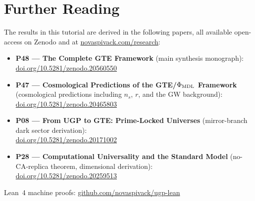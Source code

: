 \documentclass[11pt,a4paper]{article}
\begin{document}
\section*{Further Reading}
\begin{tcolorbox}[colback=orange!8,colframe=orange!50!black,
  title=\textbf{Primary Sources}]
The results in this tutorial are derived in the following papers,
all available open-access on Zenodo and at
\href{https://novaspivack.com/research}{novaspivack.com/research}:
\begin{itemize}[itemsep=2pt]
  \item \textbf{P48 --- The Complete GTE Framework} (main synthesis monograph):\\
        \href{https://doi.org/10.5281/zenodo.20560550}{doi.org/10.5281/zenodo.20560550}
  \item \textbf{P47 --- Cosmological Predictions of the GTE/$\Phi_{\rm MDL}$ Framework}
        (cosmological predictions including $n_s$, $r$, and the GW background):\\
        \href{https://doi.org/10.5281/zenodo.20465803}{doi.org/10.5281/zenodo.20465803}
  \item \textbf{P08 --- From UGP to GTE: Prime-Locked Universes}
        (mirror-branch dark sector derivation):\\
        \href{https://doi.org/10.5281/zenodo.20171002}{doi.org/10.5281/zenodo.20171002}
  \item \textbf{P28 --- Computational Universality and the Standard Model}
        (no-CA-replica theorem, dimensional derivation):\\
        \href{https://doi.org/10.5281/zenodo.20259513}{doi.org/10.5281/zenodo.20259513}
\end{itemize}
Lean~4 machine proofs:
\href{https://github.com/novaspivack/ugp-lean}{github.com/novaspivack/ugp-lean}
\end{tcolorbox}


\end{document}
